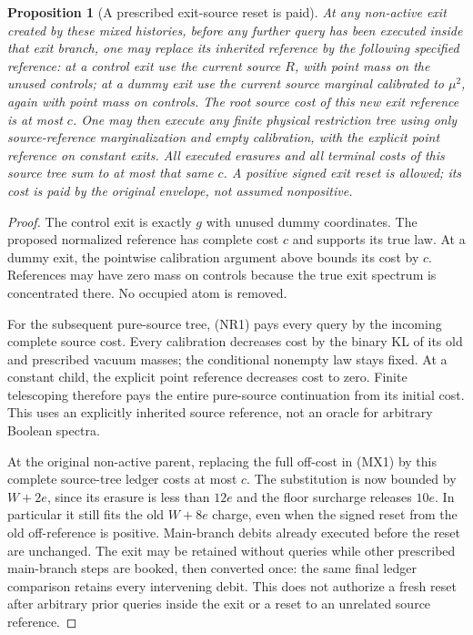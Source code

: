 \documentclass[11pt]{article}
\newtheorem{proposition}[lemma]{Proposition}
\begin{document}
\begin{proposition}[A prescribed exit-source reset is paid]
At any non-active exit created by these mixed histories, before
any further query has been executed inside that exit branch,
one may replace its inherited reference by the following specified
reference: at a control exit use the current source $R$, with point
mass on the unused controls; at a dummy exit use the current source
marginal calibrated to $\mu^2$, again with point mass on controls.
The root source cost of this new exit reference is at most $c$.
One may then execute any finite physical restriction tree using
only source-reference marginalization and empty calibration, with
the explicit point reference on constant exits. All executed
erasures and all terminal costs of this source tree sum to at most
that same $c$. A positive signed exit reset is allowed; its cost
is paid by the original envelope, not assumed nonpositive.
\end{proposition}
\begin{proof}
The control exit is exactly $g$ with unused dummy coordinates.
The proposed normalized reference has complete cost $c$ and
supports its true law. At a dummy exit, the pointwise calibration
argument above bounds its cost by $c$. References may have zero
mass on controls because the true exit spectrum is concentrated
there. No occupied atom is removed.

For the subsequent pure-source tree, (NR1) pays every query by
the incoming complete source cost. Every calibration decreases
cost by the binary KL of its old and prescribed vacuum masses;
the conditional nonempty law stays fixed. At a constant child,
the explicit point reference decreases cost to zero. Finite
telescoping therefore pays the entire pure-source continuation
from its initial cost. This uses an explicitly inherited source
reference, not an oracle for arbitrary Boolean spectra.

At the original non-active parent, replacing the full off-cost
in (MX1) by this complete source-tree ledger costs at most $c$.
The substitution is now bounded by $W+2e$, since its erasure
is less than $12e$ and the floor surcharge releases $10e$.
In particular it still fits the old $W+8e$ charge, even when the
signed reset from the old off-reference is positive. Main-branch
debits already executed before the reset are unchanged.
The exit may be retained without queries while other prescribed
main-branch steps are booked, then converted once: the same final
ledger comparison retains every intervening debit. This does not
authorize a fresh reset after arbitrary prior queries inside the
exit or a reset to an unrelated source reference.
\end{proof}
\end{document}
